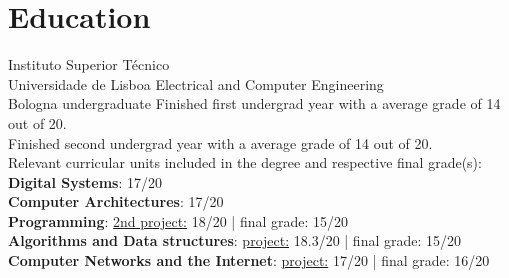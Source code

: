 \documentclass[singlesided,
               paper=a4,
               fontsize=9.3pt
              ]{my-resume}
\begin{document}
{    \section[\faMortarBoard]{Education}
        {Instituto Superior Técnico \\ Universidade de Lisboa}
        {Electrical and Computer Engineering \\ Bologna undergraduate}
        {Finished first undergrad year with a average grade of 14 out of 20. \\
        Finished second undergrad year with a average grade of 14 out of 20. \\
        Relevant curricular units included in the degree and respective final grade(s): \\
        \textbf{Digital Systems}: 17/20 \\
        \textbf{Computer Architectures}: 17/20 \\
        \textbf{Programming}: \href{https://github.com/Joao-Ex-Machina/Covid19_MEEC_FINAL}{2nd project:} 18/20 | final grade: 15/20 \\ 
         \textbf{Algorithms and Data structures}: \href{https://github.com/Joao-Ex-Machina/Raiders-of-all-Pyramids}{project:} 18.3/20 | final grade: 15/20 \\
         \textbf{Computer Networks and the Internet}: \href{https://github.com/Joao-Ex-Machina/Tree-Network-Client}{project:} 17/20 | final grade: 16/20
        }
}
\end{document}
